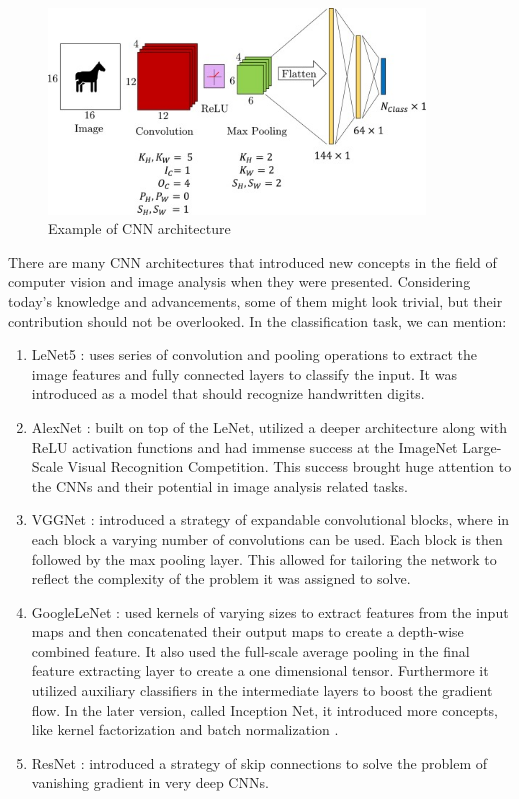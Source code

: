 \begin{figure}[H]
\begin{centering}
\includegraphics[width=10cm]{assets/images/cnn-full.jpg}
\par\end{centering}
\caption{Example of CNN architecture \cite{Santosh2022-2}}
\label{fig:full-cnn}
\end{figure}

There are many CNN architectures that introduced new concepts in the field of computer vision and image analysis when they were presented. Considering today's knowledge and advancements, some of them might look trivial, but their contribution should not be overlooked. In the classification task, we can mention:

\begin{enumerate}
    \item LeNet5 \cite{LeCun2015-2}: uses series of convolution and pooling operations to extract the image features and fully connected layers to classify the input. It was introduced as a model that should recognize handwritten digits.
    \item AlexNet \cite{Krizhevsky2012}: built on top of the LeNet, utilized a deeper architecture along with ReLU activation functions and had immense success at the ImageNet Large-Scale Visual Recognition Competition. This success brought huge attention to the  CNNs and their potential in image analysis related tasks.
    \item VGGNet \cite{Simonyan2014}: introduced a strategy of expandable convolutional blocks, where in each block a varying number of convolutions can be used. Each block is then followed by the max pooling layer. This allowed for tailoring the network to reflect the complexity of the problem it was assigned to solve.
    \item GoogleLeNet \cite{Szegedy2015}: used kernels of varying sizes to extract features from the input maps and then concatenated their output maps to create a depth-wise combined feature. It also used the full-scale average pooling in the final feature extracting layer to create a one dimensional tensor. Furthermore it utilized auxiliary classifiers in the intermediate layers to boost the gradient flow. In the later version, called Inception Net, it introduced more concepts, like kernel factorization and batch normalization \cite{Szegedy2016-2}.
    \item ResNet \cite{He2016}: introduced a strategy of skip connections to solve the problem of vanishing gradient in very deep CNNs. 
\end{enumerate}

